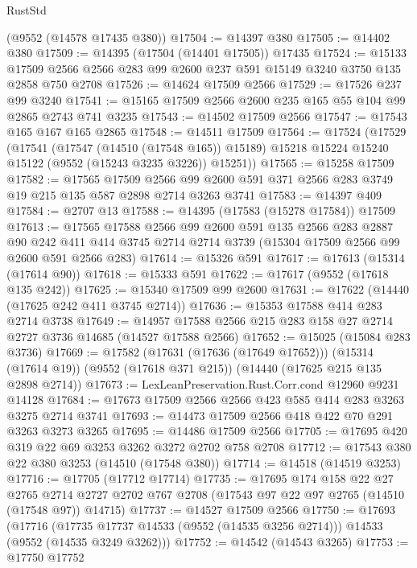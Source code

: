 \begin{lexlean}{RustStd}
\begin{coremodule}
    (@9552 (@14578 @17435 @380))
@17504 := @14397 @380
@17505 := @14402 @380
@17509 := @14395 (@17504 (@14401 @17505)) @17435
@17524 := @15133
    @17509
    @2566
    @2566
    @283
    @99
    @2600
    @237
    @591
    @15149
    @3240
    @3750
    @135
    @2858
    @750
    @2708
@17526 := @14624 @17509 @2566
@17529 := @17526 @237 @99 @3240
@17541 := @15165 @17509 @2566 @2600 @235 @165 @55 @104 @99 @2865 @2743 @741 @3235
@17543 := @14502 @17509 @2566
@17547 := @17543 @165 @167 @165 @2865
@17548 := @14511 @17509
@17564 := @17524
    (@17529
      (@17541
        (@17547 (@14510 (@17548 @165)) @15189)
        @15218
        @15224
        @15240
        @15122
        (@9552 (@15243 @3235 @3226))
        @15251))
@17565 := @15258 @17509
@17582 := @17565
    @17509
    @2566
    @99
    @2600
    @591
    @371
    @2566
    @283
    @3749
    @19
    @215
    @135
    @587
    @2898
    @2714
    @3263
    @3741
@17583 := @14397 @409
@17584 := @2707 @13
@17588 := @14395 (@17583 (@15278 @17584)) @17509
@17613 := @17565
    @17588
    @2566
    @99
    @2600
    @591
    @135
    @2566
    @283
    @2887
    @90
    @242
    @411
    @414
    @3745
    @2714
    @2714
    @3739
    (@15304 @17509 @2566 @99 @2600 @591 @2566 @283)
@17614 := @15326 @591
@17617 := @17613 (@15314 (@17614 @90))
@17618 := @15333 @591
@17622 := @17617 (@9552 (@17618 @135 @242))
@17625 := @15340 @17509 @99 @2600
@17631 := @17622 (@14440 (@17625 @242 @411 @3745 @2714))
@17636 := @15353 @17588 @414 @283 @2714 @3738
@17649 := @14957 @17588 @2566 @215 @283 @158 @27 @2714 @2727 @3736 @14685 (@14527 @17588 @2566)
@17652 := @15025 (@15084 @283 @3736)
@17669 := @17582
    (@17631 (@17636 (@17649 @17652)))
    (@15314 (@17614 @19))
    (@9552 (@17618 @371 @215))
    (@14440 (@17625 @215 @135 @2898 @2714))
@17673 := LexLeanPreservation.Rust.Corr.cond @12960 @9231 @14128
@17684 := @17673 @17509 @2566 @2566 @423 @585 @414 @283 @3263 @3275 @2714 @3741
@17693 := @14473 @17509 @2566 @418 @422 @70 @291 @3263 @3273 @3265
@17695 := @14486 @17509 @2566
@17705 := @17695 @420 @319 @22 @69 @3253 @3262 @3272 @2702 @758 @2708
@17712 := @17543 @380 @22 @380 @3253 (@14510 (@17548 @380))
@17714 := @14518 (@14519 @3253)
@17716 := @17705 (@17712 @17714)
@17735 := @17695
    @174
    @158
    @22
    @27
    @2765
    @2714
    @2727
    @2702
    @767
    @2708
    (@17543 @97 @22 @97 @2765 (@14510 (@17548 @97)) @14715)
@17737 := @14527 @17509 @2566
@17750 := @17693
    (@17716 (@17735 @17737 @14533 (@9552 (@14535 @3256 @2714))) @14533 (@9552 (@14535 @3249 @3262)))
@17752 := @14542 (@14543 @3265)
@17753 := @17750 @17752

\end{coremodule}
\end{lexlean}
